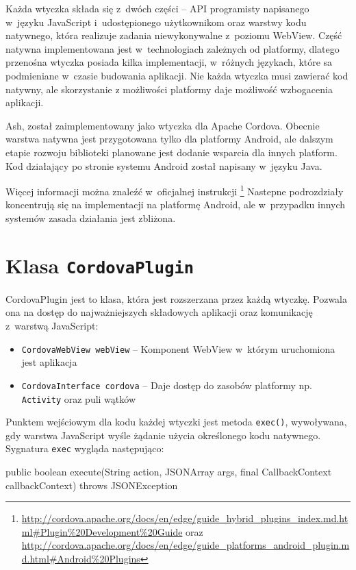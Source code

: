 \documentclass[brudnopis]{xmgr}
\begin{document}
Każda wtyczka składa się z~dwóch części -- API programisty napisanego w~języku JavaScript i~udostępionego użytkownikom oraz warstwy kodu natywnego, która realizuje zadania niewykonywalne z~poziomu WebView. Część natywna implementowana jest w~technologiach zależnych od platformy, dlatego przenośna wtyczka posiada kilka implementacji, w~różnych językach, które sa podmieniane w~czasie budowania aplikacji. Nie każda wtyczka musi zawierać kod natywny, ale skorzystanie z możliwości platformy daje możliwość wzbogacenia aplikacji.

Ash, został zaimplementowany jako wtyczka dla Apache Cordova. Obecnie warstwa natywna jest przygotowana tylko dla platformy Android, ale dalszym etapie rozwoju biblioteki planowane jest dodanie wsparcia dla innych platform. Kod działający po stronie systemu Android został napisany w~języku Java.

Więcej informacji można znaleźć w~oficjalnej instrukcji
\footnote{
  \url{http://cordova.apache.org/docs/en/edge/guide\_hybrid\_plugins\_index.md.html\#Plugin\%20Development\%20Guide}  
  oraz 
  \url{http://cordova.apache.org/docs/en/edge/guide\_platforms\_android\_plugin.md.html\#Android\%20Plugins}   
}
Nastepne podrozdziały koncentrują się na implementacji na platformę Android, ale w~przypadku innych systemów zasada działania jest zbliżona.

\section{Klasa \texttt{CordovaPlugin} }

CordovaPlugin jest to klasa, która jest rozszerzana przez każdą wtyczkę. Pozwala ona na dostęp do najważniejszych składowych aplikacji oraz komunikację z~warstwą JavaScript: 

\begin{itemize}
  \item \texttt{CordovaWebView webView} -- Komponent WebView w~którym uruchomiona jest aplikacja
  \item \texttt{CordovaInterface cordova} -- Daje dostęp do zasobów platformy np. \texttt{Activity} oraz puli wątków
\end{itemize}

Punktem wejściowym dla kodu każdej wtyczki jest metoda \texttt{exec()}, wywoływana, gdy warstwa JavaScript wyśle żądanie użycia określonego kodu natywnego. Sygnatura \texttt{exec} wygląda następująco:

\begin{javacode}
public boolean execute(String action, 
                       JSONArray args, 
                       final CallbackContext callbackContext) 
                       throws JSONException
\end{javacode}
\end{document}
